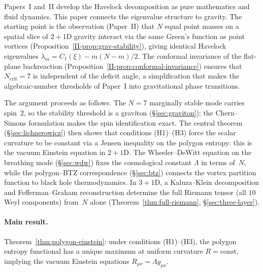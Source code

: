 Papers~I and~II develop the Havelock decomposition as
pure mathematics and fluid dynamics.
This paper connects the eigenvalue
structure to gravity.
The starting point is the observation (Paper~II) that
$N$ equal point masses on a spatial slice of
$2{+}1$D gravity interact via the same Green's function
as point vortices
(Proposition~\ref{II-prop:grav-stability}), giving identical Havelock
eigenvalues $\lambda_m = C_1(\xi) - m(N{-}m)/2$.
The conformal invariance of the flat-plane backreaction
(Proposition~\ref{II-prop:conformal-invariance}) ensures that
$N_{\mathrm{crit}} = 7$ is independent of the deficit angle, a
simplification that makes the algebraic-number thresholds of
Paper~I into gravitational phase transitions.

The argument proceeds as follows.
The $N = 7$ marginally stable mode carries spin~$2$,
so the stability threshold is a graviton
(\S\ref{sec:graviton}); the Chern--Simons formulation
makes the spin identification exact.
The central theorem (\S\ref{sec:lichnerowicz}) then shows
that conditions (H1)--(H3) force the scalar curvature
to be constant via a Jensen inequality on the polygon
entropy: this is the vacuum Einstein equation in $2{+}1$D.
The Wheeler--DeWitt equation on the breathing mode
(\S\ref{sec:wdw}) fixes the cosmological constant $\Lambda$
in terms of~$N$, while the polygon--BTZ correspondence
(\S\ref{sec:btz}) connects the vortex partition function
to black hole thermodynamics.
In $3{+}1$D, a Kaluza--Klein decomposition and
Fefferman--Graham reconstruction determine the full
Riemann tensor (all $10$ Weyl components) from~$N$
alone (Theorem~\ref{thm:full-riemann},
\S\ref{sec:three-layer}).

\paragraph{Main result.}
Theorem~\ref{thm:polygon-einstein}:
under conditions (H1)--(H3), the polygon entropy functional
has a unique maximum at uniform curvature $R = \mathrm{const}$,
implying the vacuum Einstein equations
$R_{\mu\nu} = \Lambda g_{\mu\nu}$.

